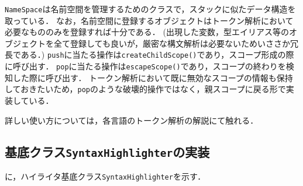 \documentclass[autodetect-engine,dvi=dvipdfmx,ja=standard,
               a4j,11pt]{bxjsarticle}
\newcommand{\figref}[1]{\makebox{図~\ref{#1}}}
\begin{document}
\verb|NameSpace|は名前空間を管理するためのクラスで，スタックに似たデータ構造を取っている．
なお，名前空間に登録するオブジェクトはトークン解析において必要なもののみを登録すれば十分である．
(出現した変数，型エイリアス等のオブジェクトを全て登録しても良いが，厳密な構文解析は必要ないためいささか冗長である．)
\verb|push|に当たる操作は\verb|createChildScope()|であり，スコープ形成の際に呼び出す．
\verb|pop|に当たる操作は\verb|escapeScope()|であり，スコープの終わりを検知した際に呼び出す．
トークン解析において既に無効なスコープの情報も保持しておきたいため，\verb|pop|のような破壊的操作ではなく，親スコープに戻る形で実装している．

詳しい使い方については，各言語のトークン解析の解説にて触れる．

\subsection{基底クラス{\tt SyntaxHighlighter}の実装} \label{sec:highlighterClass}

\figref{prog:base}に，ハイライタ基底クラス\verb|SyntaxHighlighter|を示す．
\end{document}
